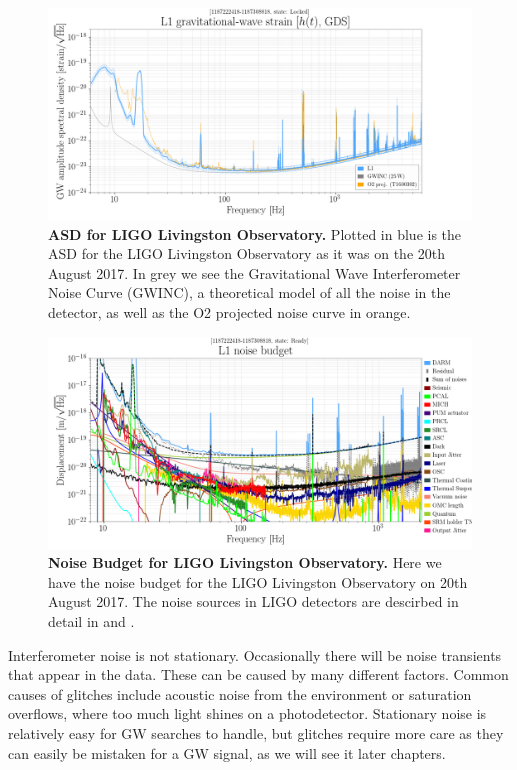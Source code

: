 \documentclass[11pt]{cuthesis}
\begin{document}
\begin{figure}[ht]
\centering
\includegraphics[width=16cm]{L1-ASD-20170820.png} 
\caption{\textbf{ASD for LIGO Livingston Observatory.} Plotted in blue is the ASD for the LIGO Livingston Observatory as it was on the 20th August 2017. In grey we see the Gravitational Wave Interferometer Noise Curve (GWINC), a theoretical model of all the noise in the detector, as well as the O2 projected noise curve in orange. }
\label{fig:asd}
\end{figure}

\begin{landscape}
\begin{figure}[ht]
\centering
\includegraphics[width=22cm]{L1-NOISE_BUDGET-20170820.png} 
\caption{\textbf{Noise Budget for LIGO Livingston Observatory.} Here we have the noise budget for the LIGO Livingston Observatory on 20th August 2017. The noise sources in LIGO detectors are descirbed in detail in \cite{noise_budget_martynov} and \cite{GW150914-detector}.}
\label{fig:noise budget}
\end{figure}
\end{landscape}

Interferometer noise is not stationary. Occasionally there will be noise transients that appear in the data. These can be caused by many different factors. Common causes of glitches include acoustic noise from the environment or saturation overflows, where too much light shines on a photodetector. Stationary noise is relatively easy for GW searches to handle, but glitches require more care as they can easily be mistaken for a GW signal, as we will see it later chapters.
\end{document}
